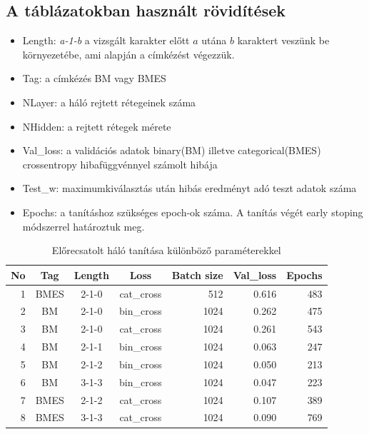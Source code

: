 \documentclass[a4paper, magyar]{article}
\begin{document}
\subsection{A táblázatokban használt rövidítések}
\begin{itemize}
	\item Length: \textit{a-1-b} a vizsgált karakter előtt $a$ utána $b$ karaktert veszünk be környezetébe, ami alapján a címkézést végezzük.
	\item Tag: a címkézés BM vagy BMES
	\item NLayer: a háló rejtett rétegeinek száma
	\item NHidden: a rejtett rétegek mérete
	\item Val\_loss: a validációs adatok binary(BM) illetve categorical(BMES) crossentropy hibafüggvénnyel számolt hibája
	\item Test\_w: maximumkiválasztás után hibás eredményt adó teszt adatok száma
	\item Epochs: a tanításhoz szükséges epoch-ok száma. A tanítás végét early stoping módszerrel határoztuk meg.
\end{itemize}
\begin{table}[htp]\centering
	\begin{tabular}{|r|c|c|c|r|r|r|}
		\hline
		No&Tag&Length&Loss&Batch size&Val\_loss&Epochs\\
		\hline\hline
		1&BMES&2-1-0&cat\_cross&512&0.616&483\\ 
		\hline
		2&BM&2-1-0&bin\_cross&1024&0.262&475\\
		\hline
		3&BM&2-1-0&cat\_cross&1024&0.261&543\\
		\hline
		4&BM&2-1-1&bin\_cross&1024&0.063&247\\
		\hline
		5&BM&2-1-2&bin\_cross&1024&0.050&213\\
		\hline
		6&BM&3-1-3&bin\_cross&1024&0.047&223\\
		\hline
		7&BMES&2-1-2&cat\_cross&1024&0.107&389\\
		\hline
		8&BMES&3-1-3&cat\_cross&1024&0.090&769\\
		\hline
	\end{tabular}
	\caption{Előrecsatolt háló tanítása különböző paraméterekkel}
	\label{tab:firstlearn}
\end{table}
\end{document}
